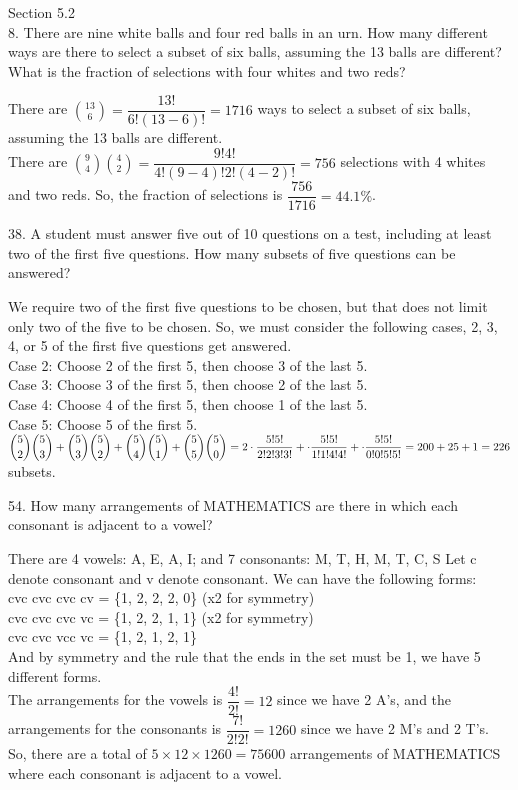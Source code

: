 \documentclass[12pt]{article}
\begin{document}
Section 5.2 \\
8. There are nine white balls and four red balls in an urn. How
many different ways are there to select a subset of six balls, 
assuming the 13 balls are different? What is the fraction of 
selections with four whites and two reds? 
\begin{solution}
    There are $\binom{13}{6}=\dfrac{13!}{6!(13-6)!}=1716$ ways to 
    select a subset of six balls, assuming the 13 balls are different. \\
    There are $\binom{9}{4}\binom{4}{2}=\dfrac{9!4!}{4!(9-4)!2!(4-2)!}
    =756$ selections with 4 whites and two reds. So, the fraction of 
    selections is $\dfrac{756}{1716}=44.1\%$.  
\end{solution}
38. A student must answer five out of 10 questions on a test, 
including at least two of the first five questions. How many 
subsets of five questions can be answered?
\begin{solution}
    We require two of the first five questions to be chosen, but 
    that does not limit only two of the five to be chosen. So, we must 
    consider the following cases, 2, 3, 4, or 5 of the first five 
    questions get answered. \\
    Case 2: Choose 2 of the first 5, then choose 3 of the last 5. \\
    Case 3: Choose 3 of the first 5, then choose 2 of the last 5. \\ 
    Case 4: Choose 4 of the first 5, then choose 1 of the last 5. \\
    Case 5: Choose 5 of the first 5. \\
    $
    \dbinom{5}{2}\dbinom{5}{3}
    +\dbinom{5}{3}\dbinom{5}{2}
    +\dbinom{5}{4}\dbinom{5}{1}
    +\dbinom{5}{5}\dbinom{5}{0}
    =2\cdot\dfrac{5!5!}{2!2!3!3!}
    +\cdot\dfrac{5!5!}{1!1!4!4!}
    +\cdot\dfrac{5!5!}{0!0!5!5!}
    =200 + 25 + 1 = 226
    $ subsets. 
\end{solution}
54. How many arrangements of MATHEMATICS are there in which each consonant
is adjacent to a vowel?
\begin{solution}
    There are 4 vowels: A, E, A, I; and 7 consonants: M, T, H, M, T, C, S 
    Let c denote consonant and v denote consonant. 
    We can have the following forms: \\
    cvc cvc cvc cv = \{1, 2, 2, 2, 0\} (x2 for symmetry)\\
    cvc cvc cvc vc = \{1, 2, 2, 1, 1\} (x2 for symmetry)\\
    cvc cvc vcc vc = \{1, 2, 1, 2, 1\}\\
    And by symmetry and the rule that the ends in the 
    set must be 1, we have 5 different forms. \\
    The arrangements for the vowels is $\dfrac{4!}{2!}=12$ 
    since we have 2 A's, and the arrangements for the 
    consonants is $\dfrac{7!}{2!2!}=1260$ since we have 2 M's 
    and 2 T's. \\

    So, there are a total of $5\times12\times1260=75600$ 
    arrangements of MATHEMATICS where each consonant is 
    adjacent to a vowel. 
\end{solution}
\end{document}
